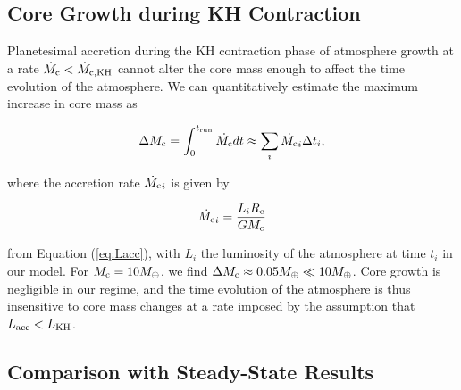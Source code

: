 \subsection{Core Growth during KH Contraction}
\label{raf3}

Planetesimal accretion during the KH contraction phase of atmosphere growth at a rate $\dot{M}_{\rm c}<\dot{M}_{\rm{c,KH}}$  cannot alter the core mass enough to affect the time evolution of the atmosphere. We can quantitatively estimate the maximum increase in core mass as 

\begin{equation}
\label{eq:cminc}
\Delta M_{\rm{c}} = \int_0^{t_{\rm{run}}} \dot{M_{\rm{c}}} dt \approx \sum_i \dot{M_{\rm{c}}}_i \Delta t_i,
\end{equation}
 
 \noindent where the accretion rate $ \dot{M_{\rm{c}}}_i $ is given by 
 
 \begin{equation}
 \label{eq:Mdotexp}
 \dot{M_{\rm{c}}}_i =\frac{L_i R_{\rm c}}{G M_{\rm{c}}} 
 \end{equation}
 
 \noindent from Equation (\ref{eq:Lacc}), with $L_i$ the luminosity of the atmosphere at time $t_i$ in our model. For $M_{\rm{c}}=10 M_{\oplus}$, we find $\Delta M_{\rm{c}} \approx 0.05 M_{\oplus} \ll 10 M_{\oplus}$. Core growth is negligible in our regime, and the time evolution of the atmosphere is thus insensitive to core mass changes at a rate imposed by the assumption that $L_{\rm{acc}}<L_{\rm{KH}}$.



\subsection{Comparison with Steady-State Results}
\label{raf2}

